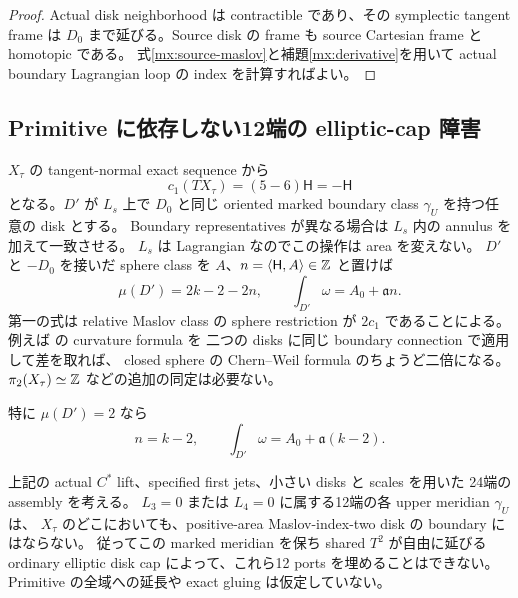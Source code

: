 \begin{proof}
Actual disk neighborhood は contractible であり、その symplectic tangent frame は
$D_0$ まで延びる。Source disk の frame も source Cartesian frame と homotopic である。
式\eqref{mx:source-maslov}と補題\ref{mx:derivative}を用いて
actual boundary Lagrangian loop の index を計算すればよい。
\end{proof}

\subsection{Primitive に依存しない12端の elliptic-cap 障害}

$X_\tau$ の tangent-normal exact sequence から
\[
 c_1(TX_\tau)=(5-6)\mathsf H=-\mathsf H
\]
となる。$D'$ が $L_s$ 上で $D_0$ と同じ oriented marked boundary class
$\gamma_U$ を持つ任意の disk とする。
Boundary representatives が異なる場合は $L_s$ 内の annulus を加えて一致させる。
$L_s$ は Lagrangian なのでこの操作は area を変えない。
$D'$ と $-D_0$ を接いだ sphere class を $A$、$n=\langle\mathsf H,A\rangle\in\mathbb Z$ と置けば
\begin{equation}\label{mx:sphere-comparison}
 \mu(D')=2k-2-2n,\qquad
 \int_{D'}\omega=A_0+\mathfrak a n.
\end{equation}
第一の式は relative Maslov class の sphere restriction が $2c_1$ であることによる。
例えば \cite[Definition 2.8 and Theorem 3.1]{cho-shin-maslov}の curvature formula を
二つの disks に同じ boundary connection で適用して差を取れば、
closed sphere の Chern--Weil formula のちょうど二倍になる。
$\pi_2(X_\tau)\simeq\mathbb Z$ などの追加の同定は必要ない。

特に $\mu(D')=2$ なら
\begin{equation}\label{mx:maslov-two-area}
 n=k-2,\qquad \int_{D'}\omega=A_0+\mathfrak a(k-2).
\end{equation}

\begin{theorem}
\label{mx:twelve-caps}
上記の actual $C^*$ lift、specified first jets、小さい disks と scales を用いた
24端の assembly を考える。
$L_3=0$ または $L_4=0$ に属する12端の各 upper meridian $\gamma_U$ は、
$X_\tau$ のどこにおいても、positive-area Maslov-index-two disk の boundary にはならない。
従ってこの marked meridian を保ち shared $T^2$ が自由に延びる
ordinary elliptic disk cap によって、これら12 ports を埋めることはできない。
Primitive の全域への延長や exact gluing は仮定していない。
\end{theorem}

